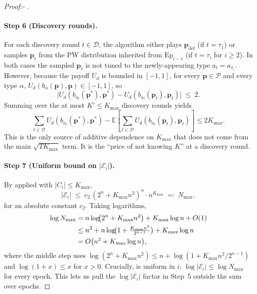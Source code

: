 \documentclass[letterpaper,9pt,twocolumn]{extarticle}
\newcommand{\pvec}{\mathbf{p}}
\newcommand{\cP}{\mathcal{P}}
\newcommand{\cE}{\mathcal{E}}
\newcommand{\EE}{\mathbb{E}}
\newcommand{\Kmax}{K_{\max}}
\newcommand{\Nmax}{N_{\max}}
\theoremstyle{plain}
\theoremstyle{definition}
\theoremstyle{remark}
\begin{document}
\begin{proof}[Proof:- ]
\paragraph{Step 6 (Discovery rounds).}
For each discovery round $t\in\mathcal{D}$, the algorithm either plays
$\pvec_{\text{def}}$ (if $t=\tau_1$) or samples $\pvec_t$ from the PW
distribution inherited from $\mathrm{Ep}_{i-1}$ (if $t=\tau_i$ for
$i\ge 2$). In both cases the sampled $\pvec_t$ is not tuned to the
newly-appearing type $a_t=a_{\tau_i}$. However, because the payoff
$U_d$ is bounded in $[-1,1]$, for every $\pvec\in\cP$ and every type
$\alpha$, $U_d(b_\alpha(\pvec),\pvec)\in[-1,1]$, so
\begin{equation}
\bigl|U_d(b_{a_t}(\pvec^{*}),\pvec^{*})-U_d(b_{a_t}(\pvec_t),\pvec_t)\bigr|\;\le\;2.
\label{eq:disc-bound}
\end{equation}
Summing  over the at most $K'\le\Kmax$ discovery rounds
yields
\begin{equation}
\sum_{t\in\mathcal{D}}\!U_d(b_{a_t}(\pvec^{*}),\pvec^{*})-\EE\!\left[\sum_{t\in\mathcal{D}}\!U_d(b_{a_t}(\pvec_t),\pvec_t)\right]\le 2\Kmax.
\label{eq:disc-sum}
\end{equation}
This is the only source of additive dependence on $\Kmax$ that does not
come from the main $\sqrt{T\Kmax}$ term. It is the ``price of not knowing
$K$'' at a discovery round.

\paragraph{Step 7 (Uniform bound on $|\cE_i|$).}
By  applied with $|C_i|\le\Kmax$,
\[
|\cE_i|\;\le\;c_2\,(2^n+\Kmax n^2)^n\cdot n^{\Kmax}\;\eqqcolon\;\Nmax,
\]
for an absolute constant $c_2$. Taking logarithms,
\begin{align}
\log\Nmax &= n\log\!\bigl(2^n+\Kmax n^2\bigr)+\Kmax\log n+O(1)\notag\\
&\le n^2+n\log\!\bigl(1+\tfrac{\Kmax n^2}{2^{n-1}}\bigr)+\Kmax\log n\notag\\
&= O\bigl(n^2+\Kmax\log n\bigr),
\label{eq:logN}
\end{align}
where the middle step uses $\log(2^n+\Kmax n^2)\le n+\log(1+\Kmax n^2/2^{n-1})$
and $\log(1+x)\le x$ for $x>0$. Crucially,  is uniform in
$i$: $\log|\cE_i|\le\log\Nmax$ for every epoch. This lets us pull the
$\log|\cE_i|$ factor in Step~5 outside the sum over epochs.


\end{proof}
\end{document}
